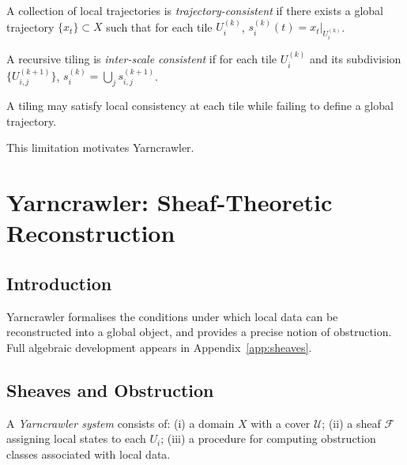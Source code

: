 \documentclass[11pt,openany]{book}
\begin{document}
\begin{definition}
\label{def:trajectory-consistency}
A collection of local trajectories is
\emph{trajectory-consistent} if there exists a global
trajectory $\{x_t\} \subset X$ such that for each tile
$U_i^{(k)}$, $s_i^{(k)}(t) = x_t|_{U_i^{(k)}}$.
\end{definition}

\begin{definition}
\label{def:inter-scale}
A recursive tiling is \emph{inter-scale consistent} if for
each tile $U_i^{(k)}$ and its subdivision
$\{U_{i,j}^{(k+1)}\}$,
$s_i^{(k)} = \bigcup_j s_{i,j}^{(k+1)}$.
\end{definition}

\begin{proposition}
\label{prop:failure}
A tiling may satisfy local consistency at each tile while
failing to define a global trajectory.
\end{proposition}

This limitation motivates Yarncrawler.


\chapter{Yarncrawler: Sheaf-Theoretic Reconstruction}
\label{ch:yarncrawler}

\section{Introduction}
\label{sec:introduction-yarncrawler}

Yarncrawler formalises the conditions under which local
data can be reconstructed into a global object, and
provides a precise notion of obstruction. Full algebraic
development appears in Appendix~\ref{app:sheaves}.

\section{Sheaves and Obstruction}
\label{sec:sheaves}

\begin{definition}
\label{def:yarncrawler}
A \emph{Yarncrawler system} consists of: (i) a domain $X$
with a cover $\mathcal{U}$; (ii) a sheaf $\mathcal{F}$
assigning local states to each $U_i$; (iii) a procedure for
computing obstruction classes associated with local data.
\end{definition}
\end{document}
